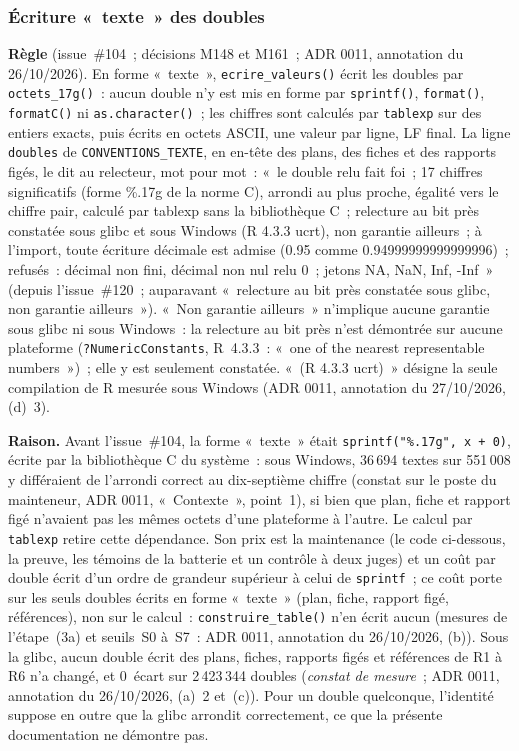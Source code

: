 \documentclass[a4paper,11pt]{article}
\newcommand{\code}[1]{\texttt{\small #1}}
\begin{document}
\subsubsection*{Écriture «~texte~» des doubles}

\textbf{Règle} (issue~\#104~; décisions M148 et M161~; ADR 0011,
annotation du 26/10/2026). En forme «~texte~», \code{ecrire\_valeurs()}
écrit les doubles par \code{octets\_17g()}~: aucun double n'y est mis en
forme par \code{sprintf()}, \code{format()}, \code{formatC()} ni
\code{as.character()}~; les chiffres sont calculés par \code{tablexp} sur des
entiers exacts, puis écrits en octets ASCII, une valeur par ligne, LF final.
La ligne \code{doubles} de \code{CONVENTIONS\_TEXTE}, en en-tête des plans,
des fiches et des rapports figés, le dit au relecteur, mot pour mot~:
«~le double relu fait foi~; 17 chiffres significatifs (forme \%.17g de la
norme C), arrondi au plus proche, égalité vers le chiffre pair, calculé par
tablexp sans la bibliothèque C~; relecture au bit près constatée sous glibc
et sous Windows (R 4.3.3 ucrt), non garantie ailleurs~; à l'import, toute
écriture décimale est admise (0.95 comme 0.94999999999999996)~; refusés~:
décimal non fini, décimal non nul relu 0~; jetons NA, NaN, Inf, -Inf~»
(depuis l'issue~\#120~; auparavant «~relecture au bit près constatée sous
glibc, non garantie ailleurs~»). «~Non garantie ailleurs~» n'implique
aucune garantie sous glibc ni sous Windows~: la relecture au bit près n'est
démontrée sur aucune plateforme (\code{?NumericConstants}, R~4.3.3~: «~one
of the nearest representable numbers~»)~; elle y est seulement constatée.
«~(R 4.3.3 ucrt)~» désigne la seule compilation de R mesurée sous Windows
(ADR 0011, annotation du 27/10/2026, (d)~3).

\medskip
\noindent
\textbf{Raison.} Avant l'issue~\#104, la forme «~texte~» était
\code{sprintf("\%.17g", x + 0)}, écrite par la bibliothèque C du système~:
sous Windows, 36\,694 textes sur 551\,008 y différaient de l'arrondi correct
au dix-septième chiffre (constat sur le poste du mainteneur, ADR 0011,
«~Contexte~», point~1), si bien que plan, fiche et rapport figé n'avaient pas
les mêmes octets d'une plateforme à l'autre. Le calcul par \code{tablexp}
retire cette dépendance. Son prix est la maintenance (le code ci-dessous, la
preuve, les témoins de la batterie et un contrôle à deux juges) et un coût
par double écrit d'un ordre de grandeur supérieur à celui de
\code{sprintf}~; ce coût porte sur les seuls doubles écrits en forme
«~texte~» (plan, fiche, rapport figé, références), non sur le calcul~:
\code{construire\_table()} n'en écrit aucun (mesures de l'étape~(3a) et
seuils~S0 à~S7~: ADR 0011, annotation du 26/10/2026, (b)). Sous la glibc,
aucun double écrit des plans, fiches, rapports figés et références de R1 à
R6 n'a changé, et 0~écart sur 2\,423\,344 doubles (\emph{constat de
mesure}~; ADR 0011, annotation du 26/10/2026, (a)~2 et~(c)). Pour un double
quelconque, l'identité suppose en outre que la glibc arrondit correctement,
ce que la présente documentation ne démontre pas.
\end{document}
